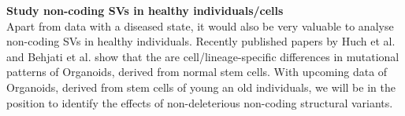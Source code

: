 \documentclass[twoside,fontsize=12pt]{article}
\begin{document}
\medskip

\noindent
\textbf{Study non-coding SVs in healthy individuals/cells} \\
Apart from data with a diseased state, it would also be very valuable to analyse non-coding SVs in healthy individuals. Recently published papers by Huch et al. and Behjati et al.\cite{Huch2014,Behjati2014} show that the are cell/lineage-specific differences in mutational patterns of Organoids, derived from normal stem cells. With upcoming data of Organoids, derived from stem cells of young an old individuals, we will be in the position to identify the effects of non-deleterious non-coding structural variants.
%
\end{document}
